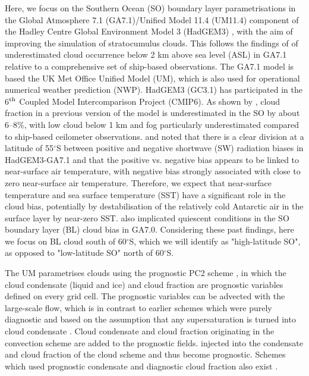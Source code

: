 Here, we focus on the Southern Ocean (SO) boundary layer parametrisations in the
Global Atmosphere 7.1 (GA7.1)/Unified Model 11.4 (UM11.4) component of the
Hadley Centre Global Environment Model 3 (HadGEM3) \citep{walters2019},
with the aim of improving the simulation of stratocumulus clouds.
This follows the findings of \cite{kuma2020a} of underestimated cloud occurrence
below 2 km above sea level (ASL) in GA7.1 relative to a comprehensive set of
ship-based observations.
The GA7.1 model is based the  UK Met Office
Unified Model (UM), which is also used for operational numerical weather
prediction (NWP). HadGEM3 (GC3.1) has participated in the 6$^{\rm th}$ Coupled
Model Intercomparison Project (CMIP6). As shown by \cite{kuma2020a}, cloud
fraction in a previous version of the model is underestimated in the SO by about 6--8\%, with low cloud below 1 km
and fog particularly underestimated compared to ship-based ceilometer
observations. \cite{schuddeboom2019} and \cite{kuma2020a} noted that there is a clear division at a latitude of 55$^\circ$S between positive and negative shortwave (SW) radiation biases in HadGEM3-GA7.1 and that the positive vs. negative bias appears to be linked to near-surface air temperature, with negative bias strongly associated with
close to zero near-surface air temperature. Therefore, we expect that
near-surface temperature and sea surface temperature (SST) have a significant role in the cloud bias, potentially by destabilisation of the relatively cold Antarctic air in the surface
layer by near-zero SST. \cite{loveridge2019} also implicated quiescent conditions in the
SO boundary layer (BL) cloud bias in GA7.0. Considering these past findings, here we focus
on BL cloud south of 60$^\circ$S, which we will identify as
"high-latitude SO", as opposed to "low-latitude SO" north of 60$^\circ$S.

The UM parametrises clouds using the prognostic PC2 scheme
\citep{wilson2008a,wilson2008b}, in which the cloud condensate (liquid and ice)
and cloud fraction are prognostic variables defined on every grid cell. The prognostic variables can be advected with the
large-scale flow, which is in contrast to earlier schemes which were purely
diagnostic \citep{smith1990} and based on the assumption that any
supersaturation is turned into cloud condensate \citep{jakob2000}. Cloud
condensate and cloud fraction originating in the convection scheme are
added to the prognostic fields.
injected
into the condensate and cloud fraction of the cloud scheme and thus become
prognostic.
Schemes which
used prognostic condensate and diagnostic cloud fraction also exist
\citep{sundqvist1978,sundqvist1989}.

